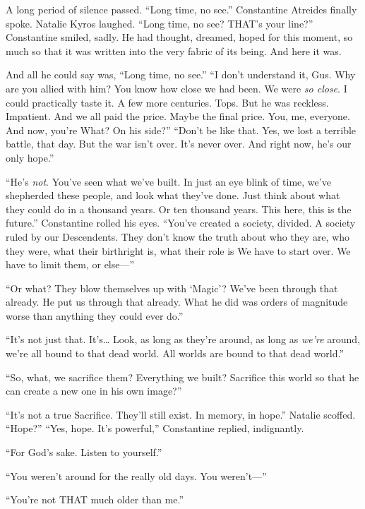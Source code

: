 A long period of silence passed.
\SomeVSpace
“Long time, no see.” Constantine Atreides finally spoke.
\SmallVSpace
Natalie Kyros laughed. “Long time, no see? THAT’s your line?”
\SmallVSpace
Constantine smiled, sadly. He had thought, dreamed, hoped for this moment, so much so that it was written into the very fabric of its being. And here it was.

And all he could say was, “Long time, no see.”
\SomeVSpace
“I don’t understand it, Gus. Why are you allied with him? You know how close we had been. We were \emph{so close}. I could practically taste it. A few more centuries. Tops. But he was reckless. Impatient. And we all paid the price. Maybe the final price. You, me, everyone. And now, you’re{\el} What? On his side?”
\SmallVSpace
“Don’t be like that. Yes, we lost a terrible battle, that day. But the war isn’t over. It’s never over. And right now, he’s our only hope.”

“He’s \emph{not}. You’ve seen what we’ve built. In just an eye blink of time, we’ve shepherded these people, and look what they’ve done. Just think about what they could do in a thousand years. Or ten thousand years. This here, this is the future.”
\SmallVSpace
Constantine rolled his eyes. “You’ve created a society, divided. A society ruled by our Descendents. They don’t know the truth about who they are, who they were, what their birthright is, what their role is{\el} We have to start over. We have to limit them, or else\mbox{---}”

“Or what? They blow themselves up with ‘Magic’? We’ve been through that already. He put us through that already. What he did was orders of magnitude worse than anything they could ever do.”

“It’s not just that. It’s… Look, as long as they’re around, as long as \emph{we’re} around, we’re all bound to that dead world. All worlds are bound to that dead world.”

“So, what, we sacrifice them? Everything we built? Sacrifice this world so that he can create a new one in his own image?”

“It’s not a true Sacrifice. They’ll still exist. In memory, in hope.”
\SmallVSpace
Natalie scoffed. “Hope?”
\SmallVSpace
“Yes, hope. It’s powerful,” Constantine replied, indignantly.

“For God’s sake. Listen to yourself.”

“You weren’t around for the really old days. You weren’t\mbox{---}”

“You’re not THAT much older than me.”

